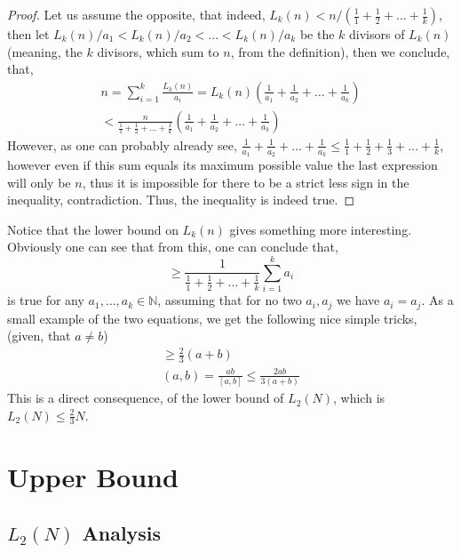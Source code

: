 \documentclass{article}
\begin{document}
\begin{proof}
Let us assume the opposite, that indeed, \(L_k(n) < n /  \left( \frac{1}{1} + \frac{1}{2} + \ldots + \frac{1}{k} \right) \), then let \(L_k(n)/a_1 < L_k(n)/a_2 < \ldots <  L_k(n) / a_k\) be the \(k\) divisors of \(L_k(n)\) (meaning, the \(k\) divisors, which sum to \(n\), from the definition), then we conclude, that,
\begin{multline}
	n = \sum_{i = 1}^k \frac{L_k(n)}{a_i} = L_k(n) \left( \frac{1}{a_1} + \frac{1}{a_2} + \ldots + \frac{1}{a_k} \right) 
	\\ < \frac{n}{\frac{1}{1} + \frac{1}{2} + \ldots + \frac{1}{k}} \left( \frac{1}{a_1} + \frac{1}{a_2} +  \ldots + \frac{1}{a_k} \right)
\end{multline}
However, as one can probably already see, \(\frac{1}{a_1} + \frac{1}{a_2} +  \ldots + \frac{1}{a_k} \leq \frac{1}{1} + \frac{1}{2} + \frac{1}{3} + \ldots + \frac{1}{k}\), however even if this sum equals its maximum possible value the last expression will only be \(n\), thus it is impossible for there to be a strict less sign in the inequality, contradiction. Thus, the inequality is indeed true.
\end{proof}

Notice that the lower bound on \(L_k(n)\) gives something more interesting. Obviously one can see that from this, one can conclude that,
\begin{equation}
	[a_1, a_2, \ldots, a_k] \geq \frac{1}{\frac{1}{1} + \frac{1}{2} + \ldots + \frac{1}{k}} \sum_{i = 1}^k a_i
\end{equation}
is true for any \(a_1, \ldots, a_k \in \mathbb{N}\), assuming that for no two \(a_i, a_j\) we have \(a_i = a_j\). As a small example of the two equations, we get the following nice simple tricks, (given, that \(a \neq b\))
\begin{gather}
	[a, b] \geq \frac{2}{3}(a + b) \\
	(a, b) = \frac{ab}{[a, b]} \leq \frac{2ab}{3(a + b)}
\end{gather}
This is a direct consequence, of the lower bound of \(L_2(N)\), which is \(L_2(N) \leq \frac{2}{3} N\).

\section{Upper Bound}

\subsection{\(L_2(N)\) Analysis}
\end{document}
